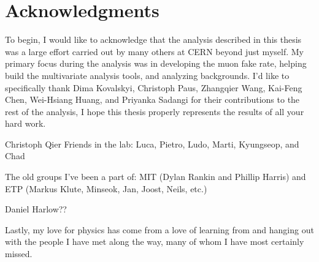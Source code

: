 


\chapter*{Acknowledgments}

To begin, I would like to acknowledge that the analysis described in this thesis was a large effort carried out by many others at CERN beyond just myself. My primary focus during the analysis was in developing the muon fake rate, helping build the multivariate analysis tools, and analyzing backgrounds. I'd like to specifically thank Dima Kovalskyi, Christoph Paus, Zhangqier Wang, Kai-Feng Chen, Wei-Hsiang Huang, and Priyanka Sadangi for their contributions to the rest of the analysis, I hope this thesis properly represents the results of all your hard work. 

Christoph
Qier 
Friends in the lab: Luca, Pietro, Ludo, Marti, Kyungseop, and Chad

The old groups I've been a part of: MIT (Dylan Rankin and Phillip Harris) and ETP (Markus Klute, Minseok, Jan, Joost, Neils, etc.)

Daniel Harlow??

Lastly, my love for physics has come from a love of learning from and hanging out with the people I have met along the way, many of whom I have most certainly missed. 
